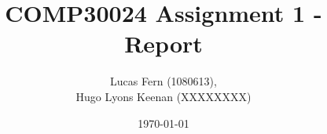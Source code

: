 \documentclass{article}
\title{COMP30024 Assignment 1 - Report}
\date{\today}
\author{Lucas Fern (1080613),\\Hugo Lyons Keenan (XXXXXXXX)}
\begin{document}
\maketitle
\blindtext
\end{document}

